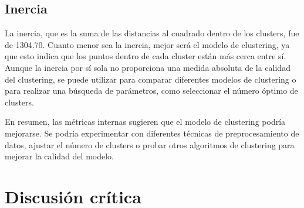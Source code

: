 \documentclass{wsdcr}
\begin{document}
\subsection{Inercia}

La inercia, que es la suma de las distancias al cuadrado dentro de los clusters, fue de 1304.70. Cuanto menor sea la inercia, mejor será el modelo de clustering, ya que esto indica que los puntos dentro de cada cluster están más cerca entre sí. Aunque la inercia por sí sola no proporciona una medida absoluta de la calidad del clustering, se puede utilizar para comparar diferentes modelos de clustering o para realizar una búsqueda de parámetros, como seleccionar el número óptimo de clusters.

En resumen, las métricas internas sugieren que el modelo de clustering podría mejorarse. Se podría experimentar con diferentes técnicas de preprocesamiento de datos, ajustar el número de clusters o probar otros algoritmos de clustering para mejorar la calidad del modelo.


\section{Discusión crítica}













\end{document}
